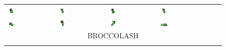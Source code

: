 \documentclass[book.tex]{subfiles}
\begin{document}
\begin{figure}[H]
\begin{table}[H]
\begin{tabularx}{\textwidth}[c]{|XXXXXX|}
  \includegraphics[width=0.17\textwidth]{screenshots_300dpi/game/sprite2a.png} &
  \includegraphics[width=0.17\textwidth]{screenshots_300dpi/game/sprite2b.png} &
  \includegraphics[width=0.17\textwidth]{screenshots_300dpi/game/sprite2c.png} &
  \includegraphics[width=0.17\textwidth]{screenshots_300dpi/game/sprite2d.png} \\  
  \includegraphics[width=0.17\textwidth]{screenshots_300dpi/game/sprite2e.png} &
  \includegraphics[width=0.17\textwidth]{screenshots_300dpi/game/sprite2f.png} &
  \includegraphics[width=0.17\textwidth]{screenshots_300dpi/game/sprite2g.png} & 
  \includegraphics[width=0.17\textwidth]{screenshots_300dpi/game/sprite2h.png} & & \\  
  \multicolumn{6}{|c|}{BROCCOLASH}  \\ \hline
  \multicolumn{6}{c}{}  \\ \hline    
  

\end{tabularx}
\end{table}
\end{figure}
\end{document}
